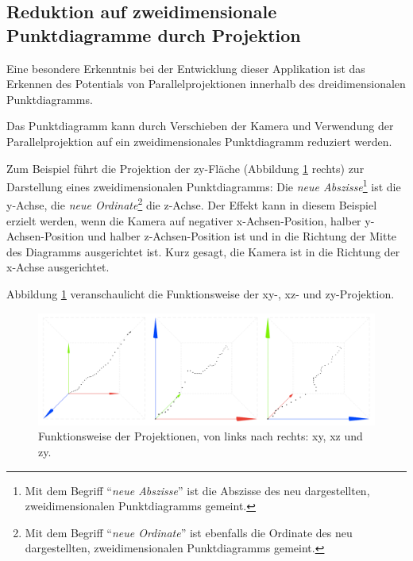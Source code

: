\subsection{Reduktion auf zweidimensionale Punktdiagramme durch Projektion}

Eine besondere Erkenntnis bei der Entwicklung dieser Applikation ist das Erkennen des Potentials von Parallelprojektionen innerhalb des dreidimensionalen Punktdiagramms.

Das Punktdiagramm kann durch Verschieben der Kamera und Verwendung der Parallelprojektion auf ein zweidimensionales Punktdiagramm reduziert werden.

Zum Beispiel führt die Projektion der zy-Fläche (Abbildung \ref{fig:compare_projections} rechts) zur Darstellung eines zweidimensionalen Punktdiagramms: 
Die \textit{neue Abszisse}\footnote{Mit dem Begriff "`\textit{neue Abszisse}"' ist die Abszisse des neu dargestellten, zweidimensionalen Punktdiagramms gemeint.} ist die y-Achse, die \textit{neue Ordinate}\footnote{Mit dem Begriff "`\textit{neue Ordinate}"' ist ebenfalls die Ordinate des neu dargestellten, zweidimensionalen Punktdiagramms gemeint.} die z-Achse. 
Der Effekt kann in diesem Beispiel erzielt werden, wenn die Kamera auf negativer x-Achsen-Position, halber y-Achsen-Position und halber z-Achsen-Position ist und in die Richtung der Mitte des Diagramms ausgerichtet ist. Kurz gesagt, die Kamera ist in die Richtung der x-Achse ausgerichtet.

Abbildung \ref{fig:compare_projections} veranschaulicht die Funktionsweise der xy-, xz- und zy-Projektion.

\begin{figure}[!htbp]
	\centering
	\begin{minipage}{\textwidth}
		\includegraphics[width=\linewidth]{images/compare_projections}
	\end{minipage}
	\caption[Funktionweise der xy-, xz- und zy-Projektion]{Funktionsweise der Projektionen, von links nach rechts: xy, xz und zy.}
	\label{fig:compare_projections}
\end{figure}


